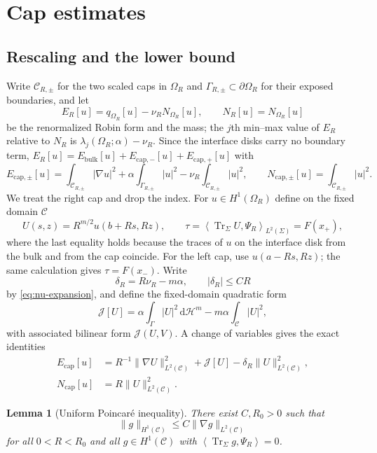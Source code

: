 \documentclass[11pt,a4paper]{article}
\numberwithin{equation}{section}
\theoremstyle{paperplain}
\newtheorem{lemma}[theorem]{Lemma}
\theoremstyle{remark}
\newcommand{\C}{\mathcal{C}}
\newcommand{\HH}{\mathcal{H}}
\newcommand{\dd}{\,\mathrm d}
\newcommand{\Tr}{\operatorname{Tr}}
\newcommand{\ip}[2]{\left\langle#1,#2\right\rangle}
\begin{document}
\section{Cap estimates}\label{sec:cap-lemma}

\subsection{Rescaling and the lower bound}
Write $\C_{R,\pm}$ for the two scaled caps in $\Omega_R$ and
$\Gamma_{R,\pm}\subset\partial\Omega_R$ for their exposed boundaries, and
let
\[
 E_R[u]=q_{\Omega_R}[u]-\nu_R N_{\Omega_R}[u],\qquad N_R[u]=N_{\Omega_R}[u]
\]
be the renormalized Robin form and the mass; the $j$th min--max value of
$E_R$ relative to $N_R$ is $\lambda_j(\Omega_R;\alpha)-\nu_R$. Since the
interface disks carry no boundary term,
$E_R[u]=E_{\mathrm{bulk}}[u]+E_{\mathrm{cap},-}[u]+E_{\mathrm{cap},+}[u]$
with
\[
 E_{\mathrm{cap},\pm}[u]=\int_{\C_{R,\pm}}|\nabla u|^2
 +\alpha\int_{\Gamma_{R,\pm}}|u|^2-\nu_R\int_{\C_{R,\pm}}|u|^2,
 \qquad N_{\mathrm{cap},\pm}[u]=\int_{\C_{R,\pm}}|u|^2.
\]
We treat the right cap and drop the index. For $u\in H^1(\Omega_R)$ define
on the fixed domain $\C$
\begin{equation}\label{eq:cap-rescale}
 U(s,z)=R^{m/2}u(b+Rs,Rz),\qquad
 \tau=\ip{\Tr_\Sigma U}{\Psi_R}_{L^2(\Sigma)}=F(x_+),
\end{equation}
where the last equality holds because the traces of $u$ on the interface
disk from the bulk and from the cap coincide. For the left cap, use
$u(a-Rs,Rz)$; the same calculation gives $\tau=F(x_-)$. Write
\[
 \delta_R=R\nu_R-m\alpha,\qquad |\delta_R|\le CR
\]
by \eqref{eq:nu-expansion}, and define the fixed-domain quadratic form
\[
 \mathcal J[U]=\alpha\int_\Gamma|U|^2\dd\HH^m-m\alpha\int_{\C}|U|^2,
\]
with associated bilinear form $\mathcal J(U,V)$. A change of variables
gives the exact identities
\begin{align}
 E_{\mathrm{cap}}[u]
 &=R^{-1}\|\nabla U\|_{L^2(\C)}^2+\mathcal J[U]-\delta_R\|U\|_{L^2(\C)}^2,
 \label{eq:exact-cap-energy}\\
 N_{\mathrm{cap}}[u]&=R\|U\|_{L^2(\C)}^2.\label{eq:exact-cap-mass}
\end{align}

\begin{lemma}[Uniform Poincar\'e inequality]\label{lem:weighted-P}
There exist $C,R_0>0$ such that
\[
 \|g\|_{H^1(\C)}\le C\|\nabla g\|_{L^2(\C)}
\]
for all $0<R<R_0$ and all $g\in H^1(\C)$ with $\ip{\Tr_\Sigma g}{\Psi_R}=0$.
\end{lemma}
\end{document}
